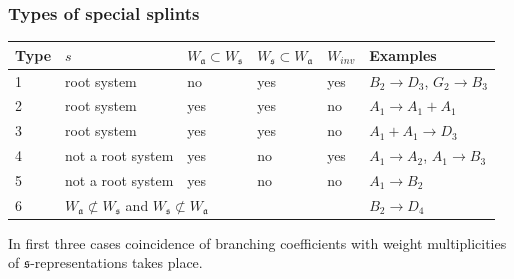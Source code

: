 \documentclass[pdftex]{beamer}
\newtheorem{Sl}{Corollary}
\newcommand{\af}{\mathfrak{a}}
\newcommand{\sfr}{\mathfrak{s}}
\theoremstyle{definition} \newtheorem{Def}{Definition}
\begin{document}
\begin{frame}
  \frametitle{Types of special splints}
  \begin{table}[h]
    \begin{tabular}[t]{|p{}|p{5em}|p{5em}|p{5em}|p{2em}|p{6em}|}
      \hline
      Type & $s$ & $W_{\af}\subset W_{\sfr}$ & $W_{\sfr}\subset W_{\af}$ & $W_{inv} $ & Examples \\
      \hline
      1 & root system & no & yes & yes  & $B_2\rightarrow D_3$, $G_2\rightarrow B_3$\\
      \hline
      2 & root system & yes & yes & no & $A_1\rightarrow A_1+A_1$ \\
      \hline
      3 & root system & yes & yes & no & $A_1+A_1\rightarrow D_3$ \\
      \hline
      4 & not a root system & yes & no & yes & $A_1\rightarrow A_2$, $A_1\rightarrow B_3$\\
      \hline
      5 & not a root system & yes & no & no  & $A_1\rightarrow B_2$\\
      \hline
      6 & \multicolumn{4}{|l|}{$W_{\af}\not\subset W_{\sfr}$ and $W_{\sfr}\not\subset W_{\af}$} & $B_2\rightarrow D_4$\\
      \hline
    \end{tabular}
    \label {spsp}
    In first three cases coincidence of branching coefficients with weight multiplicities of $\sfr$-representations takes place. 
  \end{table}
\end{frame}

\end{document}
